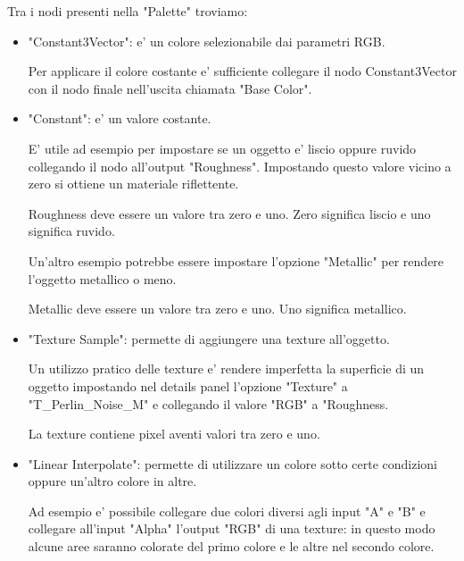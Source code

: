             Tra i nodi presenti nella "Palette" troviamo:
            \begin{itemize}
                \item "Constant3Vector": e' un colore selezionabile dai parametri RGB.

                    Per applicare il colore costante e' sufficiente collegare il nodo Constant3Vector con il nodo finale nell'uscita chiamata "Base Color".

                \item "Constant": e' un valore costante.

                    E' utile ad esempio per impostare se un oggetto e' liscio oppure ruvido collegando il nodo all'output "Roughness". Impostando questo valore vicino a zero si ottiene un materiale riflettente.

                    \begin{notebox}
                        Roughness deve essere un valore tra zero e uno. Zero significa liscio e uno significa ruvido.
                    \end{notebox}

                    Un'altro esempio potrebbe essere impostare l'opzione "Metallic" per rendere l'oggetto metallico o meno.

                    \begin{notebox}
                        Metallic deve essere un valore tra zero e uno. Uno significa metallico.
                    \end{notebox}

                \item "Texture Sample": permette di aggiungere una texture all'oggetto.

                    Un utilizzo pratico delle texture e' rendere imperfetta la superficie di un oggetto impostando nel details panel l'opzione "Texture" a "T\_Perlin\_Noise\_M" e collegando il valore "RGB" a "Roughness.

                    \begin{notebox}
                        La texture contiene pixel aventi valori tra zero e uno.
                    \end{notebox}

                \item "Linear Interpolate": permette di utilizzare un colore sotto certe condizioni oppure un'altro colore in altre.

                    Ad esempio e' possibile collegare due colori diversi agli input "A" e "B" e collegare all'input "Alpha" l'output "RGB" di una texture:
                    in questo modo alcune aree saranno colorate del primo colore e le altre nel secondo colore.


\end{itemize}
